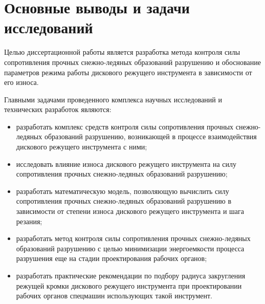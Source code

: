 \section{Основные выводы и задачи исследований}  \label{sect1_4}

Целью диссертационной работы является разработка метода контроля силы сопротивления прочных снежно-ледяных образований разрушению и обоснование параметров режима работы дискового режущего инструмента в зависимости от его износа.

Главными задачами проведенного комплекса научных исследований и технических разработок являются:
\begin{itemize}
	\item разработать комплекс средств контроля силы сопротивления прочных снежно-ледяных образований разрушению, возникающей в процессе взаимодействия дискового режущего инструмента с ними;
	\item исследовать влияние износа дискового режущего инструмента на силу сопротивления прочных снежно-ледяных образований разрушению;
	\item разработать математическую модель, позволяющую вычислить силу сопротивления прочных снежно-ледяных образований разрушению в зависимости от степени износа дискового режущего инструмента и шага резания;
	\item разработать метод контроля силы сопротивления прочных снежно-ледяных образований разрушению с целью минимизации энергоемкости процесса разрушения еще на стадии проектирования рабочих органов;
	\item разработать практические рекомендации по подбору радиуса закругления режущей кромки дискового режущего инструмента при проектировании рабочих органов спецмашин использующих такой инструмент.
\end{itemize}